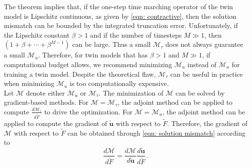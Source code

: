 The theorem implies that,
if the one-step time marching operator of the twin model is Lipschitz continuous, 
as given by \eqref{eqn: contractive}, then the
solution mismatch can be bounded by the integrated truncation error.
Unfortunately, if the Lipschitz constant $\beta>1$ and if 
the number of timesteps $M\gg 1$, then
$\left(1+ \beta+ \cdots + \beta^{M-1}\right)$ can be large. Thus
a small $\mathcal{M}_{\tau}$ does not always guarantee a small $\mathcal{M}_u$.
Therefore, for twin models that has $\beta>1$ and $M \gg 1$, 
if computational budget allows, we recommend minimizing $\mathcal{M}_u$
instead of $\mathcal{M}_u$ for training a twin model. Despite the theoretical
flaw, $\mathcal{M}_\tau$ can be useful in practice when minimizing $\mathcal{M}_u$ is
too computationally expensive.\\



Let $\mathcal{M}$ denote either $\mathcal{M}_u$
or $\mathcal{M}_{\tau}$.
The minimization of $\mathcal{M}$ can be solved by gradient-based methods.
For $\mathcal{M}=\mathcal{M}_{\tau}$, the adjoint method can be applied to compute 
$\frac{d\mathcal{M}_{\tau}}{d\tilde{F}}$ to drive the optimization.
For $\mathcal{M} = \mathcal{M}_u$, the adjoint method can be 
applied to compute the gradient of $\tilde{\boldsymbol{u}}$ with respect
to $\tilde{F}$. Therefore, the gradient of $\mathcal{M}$ with respect to $\tilde{F}$ can be 
obtained through 
\eqref{eqn: solution mismatch} according to
\begin{equation}
    \frac{d\mathcal{M}}{d\tilde{F}} = \frac{d\mathcal{M}}{d\tilde{\boldsymbol{u}}} \frac{d\tilde{\boldsymbol{u}}}{d\tilde{F}}\,.
    \label{eqn: estimated gradient temp}
\end{equation}\\


